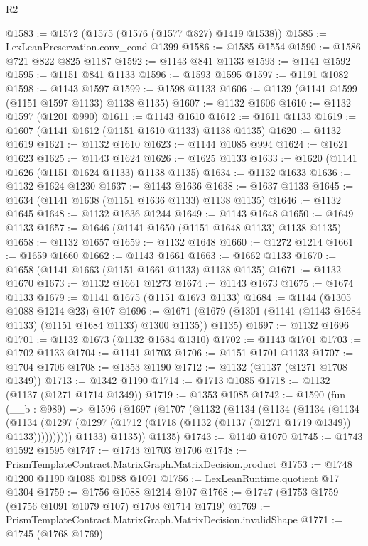 \begin{lexlean}{R2}
\begin{coremodule}
@1583 := @1572 (@1575 (@1576 (@1577 @827) @1419 @1538))
@1585 := LexLeanPreservation.conv_cond @1399
@1586 := @1585 @1554
@1590 := @1586 @721 @822 @825 @1187
@1592 := @1143 @841 @1133
@1593 := @1141 @1592
@1595 := @1151 @841 @1133
@1596 := @1593 @1595
@1597 := @1191 @1082
@1598 := @1143 @1597
@1599 := @1598 @1133
@1606 := @1139 (@1141 @1599 (@1151 @1597 @1133) @1138 @1135)
@1607 := @1132 @1606
@1610 := @1132 @1597 (@1201 @990)
@1611 := @1143 @1610
@1612 := @1611 @1133
@1619 := @1607 (@1141 @1612 (@1151 @1610 @1133) @1138 @1135)
@1620 := @1132 @1619
@1621 := @1132 @1610
@1623 := @1144 @1085 @994
@1624 := @1621 @1623
@1625 := @1143 @1624
@1626 := @1625 @1133
@1633 := @1620 (@1141 @1626 (@1151 @1624 @1133) @1138 @1135)
@1634 := @1132 @1633
@1636 := @1132 @1624 @1230
@1637 := @1143 @1636
@1638 := @1637 @1133
@1645 := @1634 (@1141 @1638 (@1151 @1636 @1133) @1138 @1135)
@1646 := @1132 @1645
@1648 := @1132 @1636 @1244
@1649 := @1143 @1648
@1650 := @1649 @1133
@1657 := @1646 (@1141 @1650 (@1151 @1648 @1133) @1138 @1135)
@1658 := @1132 @1657
@1659 := @1132 @1648
@1660 := @1272 @1214
@1661 := @1659 @1660
@1662 := @1143 @1661
@1663 := @1662 @1133
@1670 := @1658 (@1141 @1663 (@1151 @1661 @1133) @1138 @1135)
@1671 := @1132 @1670
@1673 := @1132 @1661 @1273
@1674 := @1143 @1673
@1675 := @1674 @1133
@1679 := @1141 @1675 (@1151 @1673 @1133)
@1684 := @1144 (@1305 @1088 @1214 @23) @107
@1696 := @1671 (@1679 (@1301 (@1141 (@1143 @1684 @1133) (@1151 @1684 @1133) @1300 @1135)) @1135)
@1697 := @1132 @1696
@1701 := @1132 @1673 (@1132 @1684 @1310)
@1702 := @1143 @1701
@1703 := @1702 @1133
@1704 := @1141 @1703
@1706 := @1151 @1701 @1133
@1707 := @1704 @1706
@1708 := @1353 @1190
@1712 := @1132 (@1137 (@1271 @1708 @1349))
@1713 := @1342 @1190
@1714 := @1713 @1085
@1718 := @1132 (@1137 (@1271 @1714 @1349))
@1719 := @1353 @1085
@1742 := @1590
    (fun (__b : @989) =>
    @1596
      (@1697
        (@1707
          (@1132
            (@1134
              (@1134
                (@1134
                  (@1134
                    (@1134
                      (@1297 (@1297 (@1712 (@1718 (@1132 (@1137 (@1271 @1719 @1349)) @1133))))))))))
            @1133)
          @1135))
      @1135)
@1743 := @1140 @1070
@1745 := @1743 @1592 @1595
@1747 := @1743 @1703 @1706
@1748 := PrismTemplateContract.MatrixGraph.MatrixDecision.product
@1753 := @1748 @1200 @1190 @1085 @1088 @1091
@1756 := LexLeanRuntime.quotient @17 @1304
@1759 := @1756 @1088 @1214 @107
@1768 := @1747 (@1753 @1759 (@1756 @1091 @1079 @107) @1708 @1714 @1719)
@1769 := PrismTemplateContract.MatrixGraph.MatrixDecision.invalidShape
@1771 := @1745 (@1768 @1769)

\end{coremodule}
\end{lexlean}

